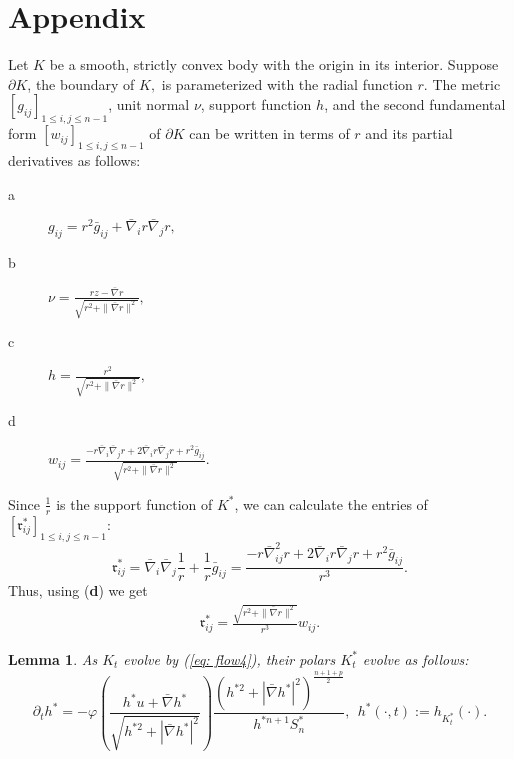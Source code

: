 \documentclass{amsart}
\newtheorem{lemma}[theorem]{Lemma}
\theoremstyle{definition}
\theoremstyle{remark}
\numberwithin{equation}{section}
\begin{document}
\section{Appendix}\label{appendix}
Let $K$ be a smooth, strictly convex body with the origin in its interior. Suppose $\partial K$, the boundary of $K,$ is parameterized with the radial function $r.$
The metric $[g_{ij}]_{1\leq i,j\leq n-1}$, unit normal $\nu$, support function $h$, and the second fundamental form $[w_{ij}]_{1\leq i,j\leq n-1}$ of $\partial K$
can be written in terms of $r$ and its partial derivatives as follows:
\begin{description}
  \item[a] $ g_{ij}=r^2\bar{g}_{ij}+\bar{\nabla}_ir\bar{\nabla}_jr,$
  \item[b] $ \nu=\frac{r z-\bar{\nabla}r}{\sqrt{r^2+\|\bar{\nabla}r\|^2}},$
  \item[c] $ h=\frac{r^2}{\sqrt{r^2+\|\bar{\nabla}r\|^2}},$
  \item[d] $ w_{ij}=\frac{-r\bar{\nabla}_i\bar{\nabla}_jr+2\bar{\nabla}_ir\bar{\nabla}_jr+
  r^2\bar{g}_{ij}}{\sqrt{r^2+\|\bar{\nabla}r\|^2}}.$
\end{description}
Since $\frac{1}{r}$ is the support function of $K^{\ast}$, we can calculate the entries of $[\mathfrak{r}^{\ast}_{ij}]_{1\leq i,j\leq n-1}$:
\[\mathfrak{r}^{\ast}_{ij}=\bar{\nabla}_i\bar{\nabla}_j\frac{1}{r}+\frac{1}{r}\bar{g}_{ij}=
\frac{-r\bar{\nabla}^2_{ij}r+2\bar{\nabla}_ir\bar{\nabla}_jr+r^2\bar{g}_{ij}}{r^3}.\]
Thus, using (\textbf{d}) we get
\begin{align*}
\mathfrak{r}^{\ast}_{ij}=\frac{\sqrt{r^2+\|\bar{\nabla}r\|^2}}{r^3}w_{ij}.
\end{align*}
\begin{lemma}\label{app1}
As $K_t$ evolve by (\ref{eq: flow4}), their polars $K_t^{\ast}$ evolve as follows:
\[\partial_th^{\ast}=-\varphi\left(\frac{h^{\ast}u+\bar{\nabla} h^{\ast}}{\sqrt{h^{\ast2}+|\bar{\nabla} h^{\ast}|^2}}\right)\frac{(h^{\ast2}+|\bar{\nabla} h^{\ast}|^2)^{\frac{n+1+p}{2}}}{h^{\ast n+1}S_n^{\ast}},~~h^{\ast}(\cdot,t):=h_{K_t^{\ast}}(\cdot).\]
\end{lemma}
\end{document}
